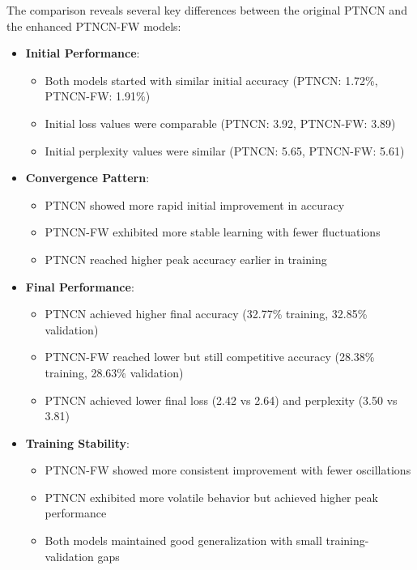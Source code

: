 \documentclass{article}
\begin{document}
The comparison reveals several key differences between the original PTNCN and the enhanced PTNCN-FW models:

\begin{itemize}
    \item \textbf{Initial Performance}:
    \begin{itemize}
        \item Both models started with similar initial accuracy (PTNCN: 1.72\%, PTNCN-FW: 1.91\%)
        \item Initial loss values were comparable (PTNCN: 3.92, PTNCN-FW: 3.89)
        \item Initial perplexity values were similar (PTNCN: 5.65, PTNCN-FW: 5.61)
    \end{itemize}

    \item \textbf{Convergence Pattern}:
    \begin{itemize}
        \item PTNCN showed more rapid initial improvement in accuracy
        \item PTNCN-FW exhibited more stable learning with fewer fluctuations
        \item PTNCN reached higher peak accuracy earlier in training
    \end{itemize}

    \item \textbf{Final Performance}:
    \begin{itemize}
        \item PTNCN achieved higher final accuracy (32.77\% training, 32.85\% validation)
        \item PTNCN-FW reached lower but still competitive accuracy (28.38\% training, 28.63\% validation)
        \item PTNCN achieved lower final loss (2.42 vs 2.64) and perplexity (3.50 vs 3.81)
    \end{itemize}

    \item \textbf{Training Stability}:
    \begin{itemize}
        \item PTNCN-FW showed more consistent improvement with fewer oscillations
        \item PTNCN exhibited more volatile behavior but achieved higher peak performance
        \item Both models maintained good generalization with small training-validation gaps
    \end{itemize}


\end{itemize}
\end{document}
